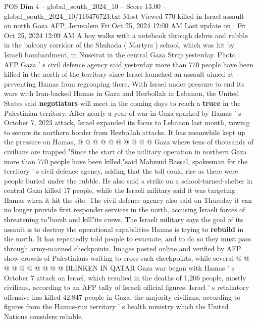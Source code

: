 \begin{textsample}{POS Dim 4 – global\_south\_2024\_10 – Score 13.00 – global\_south\_2024\_10/116476723.txt}  \label{ex:f4_pos_390}
Most Viewed 770 killed in Israel assault on north Gaza AFP, Jerusalem Fri Oct 25, 2024 12:00 AM Last update on : Fri Oct 25, 2024 12:09 AM A boy walks with a notebook through debris and rubble in the balcony corridor of the Shuhada ( Martyrs ) school, which was hit by Israeli bombardment, in Nuseirat in the central Gaza Strip yesterday.
Photo : AFP Gaza ' s civil defence agency said yesterday more than 770 people have been killed in the north of the territory since Israel launched an assault aimed at preventing Hamas from regrouping there.
With Israel under pressure to end its wars with Iran-backed Hamas in Gaza and Hezbollah in Lebanon, the United States said \textbf{negotiators} will meet in the coming days to reach a \textbf{truce} in the Palestinian territory.
After nearly a year of war in Gaza sparked by Hamas ' s October 7, 2023 attack, Israel expanded its focus to Lebanon last month, vowing to secure its northern border from Hezbollah attacks.
It has meanwhile kept up the pressure on Hamas, @ @ @ @ @ @ @ @ @ @ Gaza where tens of thousands of civilians are trapped."Since the start of the military operation in northern Gaza more than 770 people have been killed,"said Mahmud Bassal, spokesman for the territory ' s civil defence agency, adding that the toll could rise as there were people buried under the rubble.
He also said a strike on a school-turned-shelter in central Gaza killed 17 people, while the Israeli military said it was targeting Hamas when it hit the site.
The civil defence agency also said on Thursday it can no longer provide first responder services in the north, accusing Israeli forces of threatening to"bomb and kill"its crews.
The Israeli military says the goal of its assault is to destroy the operational capabilities Hamas is trying to \textbf{rebuild} in the north.
It has repeatedly told people to evacuate, and to do so they must pass through army-manned checkpoints.
Images posted online and verified by AFP show crowds of Palestinians waiting to cross such checkpoints, while several @ @ @ @ @ @ @ @ @ @ BLINKEN IN QATAR Gaza war began with Hamas ' s October 7 attack on Israel, which resulted in the deaths of 1,206 people, mostly civilians, according to an AFP tally of Israeli official figures.
Israel ' s retaliatory offensive has killed 42,847 people in Gaza, the majority civilians, according to figures from the Hamas-run territory ' s health ministry which the United Nations considers reliable.

\end{textsample}
